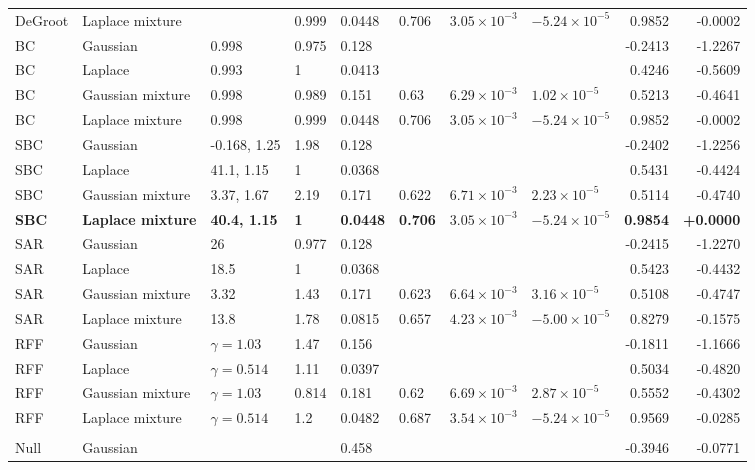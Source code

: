 \begin{longtable}{llllllllrr}
DeGroot & Laplace mixture &  & 0.999 & 0.0448 & 0.706 & $3.05\times10^{-3}$ & $-5.24\times10^{-5}$ & 0.9852 & -0.0002 \\
BC & Gaussian & 0.998 & 0.975 & 0.128 &  &  &  & -0.2413 & -1.2267 \\
BC & Laplace & 0.993 & 1 & 0.0413 &  &  &  & 0.4246 & -0.5609 \\
BC & Gaussian mixture & 0.998 & 0.989 & 0.151 & 0.63 & $6.29\times10^{-3}$ & $1.02\times10^{-5}$ & 0.5213 & -0.4641 \\
BC & Laplace mixture & 0.998 & 0.999 & 0.0448 & 0.706 & $3.05\times10^{-3}$ & $-5.24\times10^{-5}$ & 0.9852 & -0.0002 \\
SBC & Gaussian & -0.168, 1.25 & 1.98 & 0.128 &  &  &  & -0.2402 & -1.2256 \\
SBC & Laplace & 41.1, 1.15 & 1 & 0.0368 &  &  &  & 0.5431 & -0.4424 \\
SBC & Gaussian mixture & 3.37, 1.67 & 2.19 & 0.171 & 0.622 & $6.71\times10^{-3}$ & $2.23\times10^{-5}$ & 0.5114 & -0.4740 \\
\textbf{SBC} & \textbf{Laplace mixture} & \textbf{40.4, 1.15} & \textbf{1} & \textbf{0.0448} & \textbf{0.706} & \textbf{$3.05\times10^{-3}$} & \textbf{$-5.24\times10^{-5}$} & \textbf{0.9854} & \textbf{+0.0000} \\
SAR & Gaussian & 26 & 0.977 & 0.128 &  &  &  & -0.2415 & -1.2270 \\
SAR & Laplace & 18.5 & 1 & 0.0368 &  &  &  & 0.5423 & -0.4432 \\
SAR & Gaussian mixture & 3.32 & 1.43 & 0.171 & 0.623 & $6.64\times10^{-3}$ & $3.16\times10^{-5}$ & 0.5108 & -0.4747 \\
SAR & Laplace mixture & 13.8 & 1.78 & 0.0815 & 0.657 & $4.23\times10^{-3}$ & $-5.00\times10^{-5}$ & 0.8279 & -0.1575 \\
RFF & Gaussian & $\gamma=1.03$ & 1.47 & 0.156 &  &  &  & -0.1811 & -1.1666 \\
RFF & Laplace & $\gamma=0.514$ & 1.11 & 0.0397 &  &  &  & 0.5034 & -0.4820 \\
RFF & Gaussian mixture & $\gamma=1.03$ & 0.814 & 0.181 & 0.62 & $6.69\times10^{-3}$ & $2.87\times10^{-5}$ & 0.5552 & -0.4302 \\
RFF & Laplace mixture & $\gamma=0.514$ & 1.2 & 0.0482 & 0.687 & $3.54\times10^{-3}$ & $-5.24\times10^{-5}$ & 0.9569 & -0.0285 \\
\midrule
\multicolumn{10}{l}{\spinos{}} \\
Null & Gaussian &  &  & 0.458 &  &  &  & -0.3946 & -0.0771 \\

\end{longtable}
